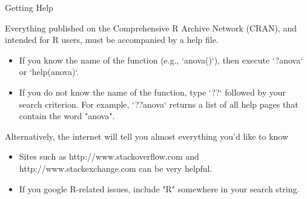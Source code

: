 \documentclass[10pt]{beamer}
\begin{document}

\begin{frame}{Getting Help}
  
Everything published on the Comprehensive R Archive Network (CRAN), and intended 
for R users, must be accompanied by a help file. 

\begin{itemize}
\item If you know the name of the function (e.g., `anova()`), then execute
  `?anova` or `help(anova)`. 
\item If you do not know the name of the function, type `??` followed by your
  search criterion. For example, `??anova` returns a list of all help pages that
  contain the word "anova". 
\end{itemize}

Alternatively, the internet will tell you almost everything you'd like to know

\begin{itemize}
\item Sites such as http://www.stackoverflow.com and http://www.stackexchange.com 
can be very helpful. 
\item If you google R-related issues, include "R" somewhere in your search string.
\end{itemize}

\end{frame}

\end{document}
